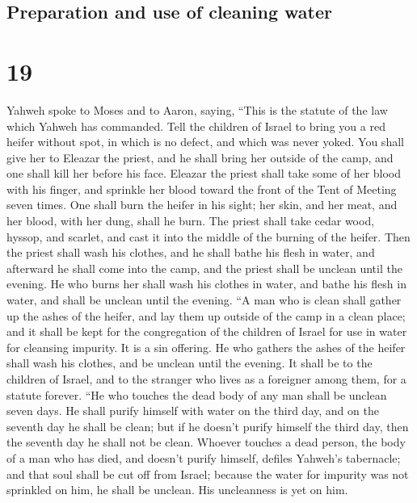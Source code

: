 \hypertarget{preparation-and-use-of-cleaning-water}{%
\subsection{Preparation and use of cleaning
water}\label{preparation-and-use-of-cleaning-water}}

\hypertarget{section-18}{%
\section{19}\label{section-18}}

 Yahweh spoke to Moses and to Aaron, saying,
 ``This is the statute of the law which Yahweh has
commanded. Tell the children of Israel to bring you a red heifer without
spot, in which is no defect, and which was never yoked. 
You shall give her to Eleazar the priest, and he shall bring her outside
of the camp, and one shall kill her before his face. 
Eleazar the priest shall take some of her blood with his finger, and
sprinkle her blood toward the front of the Tent of Meeting seven times.
 One shall burn the heifer in his sight; her skin, and her
meat, and her blood, with her dung, shall he burn.  The
priest shall take cedar wood, hyssop, and scarlet, and cast it into the
middle of the burning of the heifer.  Then the priest
shall wash his clothes, and he shall bathe his flesh in water, and
afterward he shall come into the camp, and the priest shall be unclean
until the evening.  He who burns her shall wash his
clothes in water, and bathe his flesh in water, and shall be unclean
until the evening.  ``A man who is clean shall gather up
the ashes of the heifer, and lay them up outside of the camp in a clean
place; and it shall be kept for the congregation of the children of
Israel for use in water for cleansing impurity. It is a sin offering.
 He who gathers the ashes of the heifer shall wash his
clothes, and be unclean until the evening. It shall be to the children
of Israel, and to the stranger who lives as a foreigner among them, for
a statute forever.  ``He who touches the dead body of any
man shall be unclean seven days.  He shall purify himself
with water on the third day, and on the seventh day he shall be clean;
but if he doesn't purify himself the third day, then the seventh day he
shall not be clean.  Whoever touches a dead person, the
body of a man who has died, and doesn't purify himself, defiles Yahweh's
tabernacle; and that soul shall be cut off from Israel; because the
water for impurity was not sprinkled on him, he shall be unclean. His
uncleanness is yet on him.


